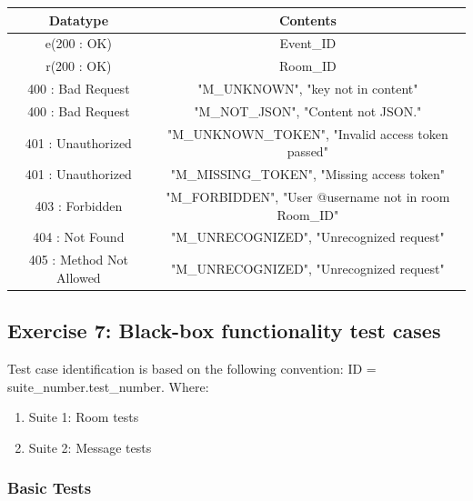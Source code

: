 \documentclass[a4paper]{article}
\begin{document}
	\begin{table}[h]
		\center
		\small
		\begin{tabular}{|c|c|}
			\hline
			\textbf{Datatype} & \textbf{Contents} \\
			\hline
			e(200 : OK) & Event\_ID \\
			\hline
			r(200 : OK) & Room\_ID \\
			\hline
			400 : Bad Request & "M\_UNKNOWN", "{key} not in content" \\
			\hline
			400 : Bad Request & "M\_NOT\_JSON", "Content not JSON." \\
			\hline
			401 : Unauthorized & "M\_UNKNOWN\_TOKEN", "Invalid access token passed" \\
			\hline
			401 : Unauthorized & "M\_MISSING\_TOKEN", "Missing access token" \\
			\hline
			403 : Forbidden & "M\_FORBIDDEN", "User @{username} not in room {Room\_ID}" \\
			\hline
			404 : Not Found & "M\_UNRECOGNIZED", "Unrecognized request" \\
			\hline
			405 : Method Not Allowed & "M\_UNRECOGNIZED", "Unrecognized request" \\
			\hline
		\end{tabular}
	\end{table}
	\subsection{Exercise 7: Black-box functionality test cases} \label{exercise-7-black-box-functionality-test-cases}
	Test case identification is based on the following convention: ID = suite\_number.test\_number. Where:
	\begin{enumerate}
		\item Suite 1: Room tests
		\item Suite 2: Message tests
	\end{enumerate}
	\subsubsection{Basic Tests} \label{basic-tests}
	
\end{document}
